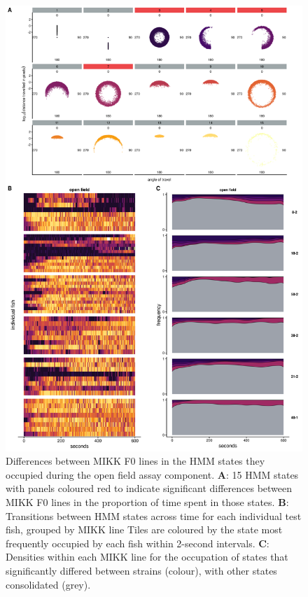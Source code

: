 \documentclass[
]{article}
\begin{document}
\begin{figure}
\includegraphics[width=1\linewidth]{figs/mikk_behaviour/select_0.08_15_sge_of} \caption{Differences between MIKK F0 lines in the HMM states they occupied during the open field assay component. \textbf{A}: 15 HMM states with panels coloured red to indicate significant differences between MIKK F0 lines in the proportion of time spent in those states. \textbf{B}: Transitions between HMM states across time for each individual test fish, grouped by MIKK line Tiles are coloured by the state most frequently occupied by each fish within 2-second intervals. \textbf{C}: Densities within each MIKK line for the occupation of states that significantly differed between strains (colour), with other states consolidated (grey).}\label{fig:F2-time-sge-of}
\end{figure}
\end{document}
